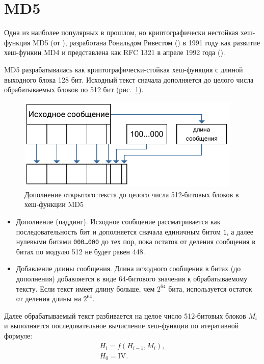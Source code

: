 \section{MD5}

Одна из наиболее популярных в прошлом, но криптографически нестойкая хеш-функция MD5 (от ), разработана Рональдом Ривестом () в 1991 году как развитие хеш-функии MD4 и представлена как RFC 1321 в апреле 1992 года (\cite{rfc1321}).

MD5 разрабатывалась как криптографически-стойкая хеш-функция с длиной выходного блока 128 бит. Исходный текст сначала дополняется до целого числа обрабатываемых блоков по 512 бит (рис.~\ref{fig:md5-padding}).

\begin{figure}[htb]
    \centering
    \includegraphics[width=0.95\textwidth]{pic/md5-padding}
    \caption{Дополнение открытого текста до целого числа 512-битовых блоков в хеш-функции MD5}
    \label{fig:md5-padding}
\end{figure}

\begin{itemize}
  \item Дополнение (паддинг). Исходное сообщение рассматривается как последовательность бит и дополняется сначала единичным битом \texttt{1}, а далее нулевыми битами \texttt{{000}\dots{000}} до тех пор, пока остаток от деления сообщения в битах по модулю 512 не будет равен 448.
  \item Добавление длины сообщения. Длина исходного сообщения в битах (до дополнения) добавляется в виде 64-битового значения к обрабатываемому тексту. Если текст имеет длину больше, чем $2^{64}$ бита, используется остаток от деления длины на $2^{64}$.
\end{itemize}

Далее обрабатываемый текст разбивается на целое число 512-битовых блоков $M_i$ и выполняется последовательное вычисление хеш-функции по итеративной формуле:
\[\begin{array}{l}
H_i = f ( H_{i-1}, M_i ),\\
H_0 = \text{IV}.\\
\end{array}\]

